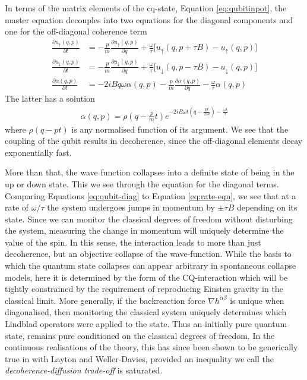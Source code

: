 \documentclass[aps,pra,showpacs,citeautoscript,amsmath,amssymb,floatfix,superscriptaddress,bbm, verbatim,amsfonts,changes,12pt,nofootinbib,longbibliography]{revtex4-2}
\def\u{u}
\def\ab{^{\alpha\beta}}
\def\down{\downarrow}
\def\up{\uparrow}
\begin{document}
In terms of the matrix elements of the cq-state, Equation \eqref{eq:qubitinpot}, the master equation decouples into two equations for the diagonal components and one for  the off-diagonal coherence term
\begin{align}
\frac{\partial\u_\up(q,p)}{\partial t} & =-\frac{p}{m} 
 \frac{\partial\u_\up(q,p)}{\partial q}
 +\frac{\omega}{\tau}\big[
 \u_\up(q,p+\tau B)-\u_\up(q,p)\big]
\nonumber\\
 \frac{\partial\u_\down(q,p)}{\partial t} & =-\frac{p}{m} 
 \frac{\partial\u_\down(q,p)}{\partial q}
 +\frac{\omega}{\tau}\big[
 \u_\down(q,p-\tau B)-\u_\down(q,p)\big] 
  \label{eq:qubit-diag}\\
 \frac{\partial\alpha(q,p)}{\partial t} &=
-2iBq\omega\alpha(q,p) 
 -\frac{p}{m} 
 \frac{\partial\alpha(q,p)}{\partial q}
 -\frac{\omega}{\tau}\alpha(q,p)
 \label{eq:qubit-offdiags}
\end{align}
The latter has a solution
\begin{align}
\alpha(q,p)=\rho(q-\frac{p}{m}t)e^{-2iB\omega t(q-\frac{pt}{2m}) -\frac{\omega t}{\tau}}
\end{align}
where $\rho(q-pt)$ is any normalised function of its argument. We see that the coupling of the qubit results in decoherence, since the off-diagonal elements decay exponentially fast. 

More than that, the wave function collapses into a definite state of being in the up or down state.
This we see through the equation for the diagonal terms. Comparing Equations \eqref{eq:qubit-diag} to Equation \eqref{eq:rate-eqn}, we see that at a rate of $\omega/\tau$ the system undergoes jumps in momentum by $\pm\tau B$ depending on its state.  Since we can monitor the classical degrees of freedom without disturbing the system, measuring the change in momentum will uniquely determine the value of the spin. In this sense, the interaction leads to more than just decoherence, but an objective collapse of the wave-function\cite{shimony1990desiderata,sep-qm-collapse}. 
While the basis to which the quantum state collapses can appear arbitrary in spontaneous collapse models, here it is determined by the form of the CQ-interaction which will be tightly constrained by the requirement of reproducing Einsten gravity in the classical limit. More generally, if the backreaction force $\nabla h\ab$ %
is unique when  diagonalised, then monitoring the classical system uniquely determines which Lindblad operators were applied to the state. Thus an initially pure quantum state, remains pure conditioned on the classical degrees of freedom. In the continuous realisations of the theory, this has since been shown to be generically true in \cite{layton2022semi} with Layton and Weller-Davies, provided an inequality we call the {\it decoherence-diffusion trade-off} is saturated.\label{ft:unique}
\end{document}
